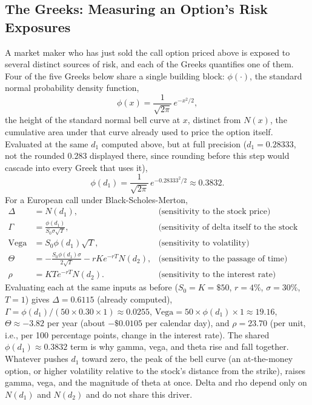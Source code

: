 \documentclass[../ai_in_finance]{subfiles}
\begin{document}
\subsection{The Greeks: Measuring an Option's Risk Exposures}
\label{sec:valuation-greeks}

A market maker who has just sold the call option priced above is exposed to several distinct sources of risk, and each of the Greeks quantifies one of them. Four of the five Greeks below share a single building block: $\phi(\cdot)$, the standard normal probability density function,
\begin{equation*}
\phi(x) = \frac{1}{\sqrt{2\pi}}\,e^{-x^2/2},
\end{equation*}
the height of the standard normal bell curve at $x$, distinct from $N(x)$, the cumulative area under that curve already used to price the option itself. Evaluated at the same $d_1$ computed above, but at full precision ($d_1 = 0.28333$, not the rounded $0.283$ displayed there, since rounding before this step would cascade into every Greek that uses it),
\begin{equation*}
\phi(d_1) = \frac{1}{\sqrt{2\pi}}\,e^{-0.28333^2/2} \approx 0.3832.
\end{equation*}
For a European call under Black-Scholes-Merton,
\begin{align*}
\Delta &= N(d_1), &\text{(sensitivity to the stock price)} \\
\Gamma &= \frac{\phi(d_1)}{S_0 \sigma \sqrt{T}}, &\text{(sensitivity of delta itself to the stock price)} \\
\text{Vega} &= S_0 \phi(d_1) \sqrt{T}, &\text{(sensitivity to volatility)} \\
\Theta &= -\frac{S_0 \phi(d_1) \sigma}{2\sqrt{T}} - r K e^{-rT} N(d_2), &\text{(sensitivity to the passage of time)} \\
\rho &= K T e^{-rT} N(d_2). &\text{(sensitivity to the interest rate)}
\end{align*}
Evaluating each at the same inputs as before ($S_0=K=\$50$, $r=4\%$, $\sigma=30\%$, $T=1$) gives $\Delta = 0.6115$ (already computed), $\Gamma = \phi(d_1)/(50 \times 0.30 \times 1) \approx 0.0255$, $\text{Vega} = 50 \times \phi(d_1) \times 1 \approx 19.16$, $\Theta \approx -3.82$ per year (about $-\$0.0105$ per calendar day), and $\rho = 23.70$ (per unit, i.e., per 100 percentage points, change in the interest rate). The shared $\phi(d_1) \approx 0.3832$ term is why gamma, vega, and theta rise and fall together. Whatever pushes $d_1$ toward zero, the peak of the bell curve (an at-the-money option, or higher volatility relative to the stock's distance from the strike), raises gamma, vega, and the magnitude of theta at once. Delta and rho depend only on $N(d_1)$ and $N(d_2)$ and do not share this driver.
\end{document}
